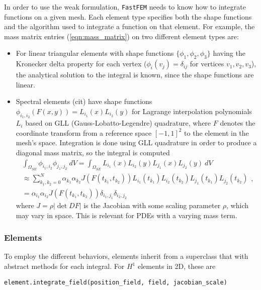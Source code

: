 In order to use the weak formulation, \texttt{FastFEM} needs to know how to integrate functions on a given mesh. Each element type specifies both the shape functions and the algorithm used to integrate a function on that element. For example, the mass matrix entries (\ref{eqn:mass_matrix}) on two different element types are:

\begin{itemize}
\item For linear triangular elements with shape functions $\{\phi_1,\phi_2,\phi_3\}$ having the Kronecker delta property for each vertex ($\phi_i(v_j) = \delta_{ij}$ for vertices $v_1,v_2,v_3$), the analytical solution to the integral is known, since the shape functions are linear.

\item Spectral elements (cit) have shape functions $\phi_{i_1,i_2}(F(x,y)) = L_{i_1}(x)L_{i_2}(y)$ for Lagrange interpolation polynomials $L_i$ based on GLL (Gauss-Lobatto-Legendre) quadrature, where $F$ denotes the coordinate transform from a reference space $[-1,1]^2$ to the element in the mesh's space. Integration is done using GLL quadrature in order to produce a diagonal mass matrix, so the integral is computed
\begin{equation}
\begin{aligned}
    \int_{\Omega_{SE}} \phi_{i_1,i_2}\phi_{j_1,j_2} ~dV = \int_{\Omega_{SE}} L_{i_1}(x)L_{i_2}(y)L_{j_1}(x)L_{j_2}(y) ~dV \\
    \approx \sum_{k_1,k_2=0}^N \alpha_{k_1}\alpha_{k_2} J(F(t_{k_1},t_{k_2}))L_{i_1}(t_{k_1})L_{i_2}(t_{k_2})L_{j_1}(t_{k_1})L_{j_2}(t_{k_2}) \\
    = \alpha_{i_1}\alpha_{i_2}J(F(t_{k_1},t_{k_2}))\delta_{i_1,j_1}\delta_{i_2,j_2}
\end{aligned},
\label{eqn:spectral_mass_matrix}
\end{equation}
where $J = \rho|\det DF|$ is the Jacobian with some scaling parameter $\rho$, which may vary in space. This is relevant for PDEs with a varying mass term.
\end{itemize}


\subsubsection{Elements}
To employ the different behaviors, elements inherit from a superclass that with abstract methods for each integral. For $H^1$ elements in 2D, these are


\begin{verbatim}
element.integrate_field(position_field, field, jacobian_scale)
\end{verbatim}

